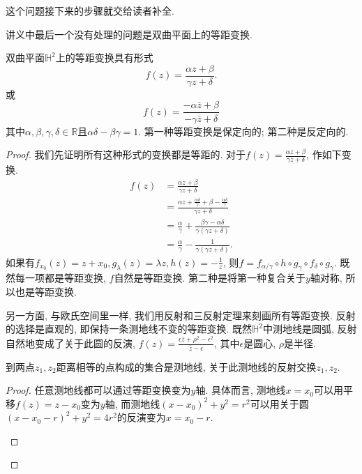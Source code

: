 \documentclass[./main.tex]{subfiles}
\begin{document}
这个问题接下来的步骤就交给读者补全.

讲义中最后一个没有处理的问题是双曲平面上的等距变换.
\begin{theorem}[Poincar\'e, 1882]
    双曲平面\(\mathbb{H}^2\)上的等距变换具有形式
    \[
        f(z)=\frac{\alpha z+\beta}{\gamma z+\delta}.
    \]
    或
    \[
        f(z)=\frac{-\alpha\bar z+\beta}{-\gamma\bar z+\delta}
    \]
    其中\(\alpha,\beta,\gamma,\delta\in\mathbb{R}\)且\(\alpha\delta-\beta\gamma=1\). 第一种等距变换是保定向的; 第二种是反定向的.
\end{theorem}
\begin{proof}
    我们先证明所有这种形式的变换都是等距的. 对于\(f(z)=\frac{\alpha z+\beta}{\gamma z+\delta}\), 作如下变换.
    \begin{align*}
        f(z)&=\frac{\alpha z+\beta}{\gamma z+\delta}\\
            &=\frac{\alpha z+\frac{\alpha\delta}{\gamma}+\beta-\frac{\alpha\delta}{\gamma}}{\gamma z+\delta}\\
            &=\frac{\alpha}{\gamma}+\frac{\beta\gamma-\alpha\delta}{\gamma(\gamma z+\delta)}\\
            &=\frac{\alpha}{\gamma}-\frac{1}{\gamma(\gamma z+\delta)}.
    \end{align*}
    如果有\(f_{x_0}(z)=z+x_0,g_{\lambda}(z)=\lambda z,h(z)=-\frac{1}{z}\), 则\(f=f_{\alpha/\gamma}\circ h\circ g_\gamma\circ f_\delta\circ g_\gamma\). 既然每一项都是等距变换, \(f\)自然是等距变换. 第二种是将第一种复合关于\(y\)轴对称, 所以也是等距变换.

    另一方面, 与欧氏空间里一样, 我们用反射和三反射定理来刻画所有等距变换. 反射的选择是直观的, 即保持一条测地线不变的等距变换. 既然\(\mathbb{H}^2\)中测地线是圆弧, 反射自然地变成了关于此圆的反演, \(f(z)=\frac{\epsilon\bar z+\rho^2-\epsilon^2}{\bar z-\epsilon}\), 其中\(\epsilon\)是圆心, \(\rho\)是半径.
\begin{lemma}
    到两点\(z_1,z_2\)距离相等的点构成的集合是测地线, 关于此测地线的反射交换\(z_1,z_2\).
\end{lemma}
\begin{proof}
    任意测地线都可以通过等距变换变为\(y\)轴. 具体而言, 测地线\(x=x_0\)可以用平移\(f(z)=z-x_0\)变为\(y\)轴, 而测地线\((x-x_0)^2+y^2=r^2\)可以用关于圆\((x-x_0-r)^2+y^2=4r^2\)的反演变为\(x=x_0-r\).
    \begin{figure}[!ht]
        \centering
    \end{figure}


\end{proof}
\end{proof}
\end{document}
